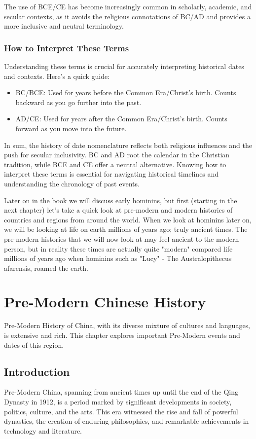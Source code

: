 \documentclass[a4paper,12pt]{book}
\begin{document}
The use of BCE/CE has become increasingly common in scholarly, academic, and secular contexts, as it avoids the religious connotations of BC/AD and provides a more inclusive and neutral terminology.

\subsection*{How to Interpret These Terms}
Understanding these terms is crucial for accurately interpreting historical dates and contexts. Here’s a quick guide:

\begin{itemize}
    \item BC/BCE: Used for years before the Common Era/Christ’s birth. Counts backward as you go further into the past.
    \item AD/CE: Used for years after the Common Era/Christ’s birth. Counts forward as you move into the future.
\end{itemize}

In sum, the history of date nomenclature reflects both religious influences and the push for secular inclusivity. BC and AD root the calendar in the Christian tradition, while BCE and CE offer a neutral alternative. Knowing how to interpret these terms is essential for navigating historical timelines and understanding the chronology of past events.

Later on in the book we will discuss early hominins, but first (starting in the next chapter) let's take a quick look at pre-modern and modern histories of countries and regions from around the world. When we look at hominins later on, we will be looking at life on earth millions of years ago; truly ancient times. The pre-modern histories that we will now look at may feel ancient to the modern person, but in reality these times are actually quite "modern" compared life millions of years ago when hominins such as "Lucy" - The Australopithecus afarensis, roamed the earth. 

\chapter{Pre-Modern Chinese History}
Pre-Modern History of China, with its diverse mixture of cultures and languages, is extensive and rich. This chapter explores important Pre-Modern events and dates of this region.

\section{Introduction}
Pre-Modern China, spanning from ancient times up until the end of the Qing Dynasty in 1912, is a period marked by significant developments in society, politics, culture, and the arts. This era witnessed the rise and fall of powerful dynasties, the creation of enduring philosophies, and remarkable achievements in technology and literature.
\end{document}
